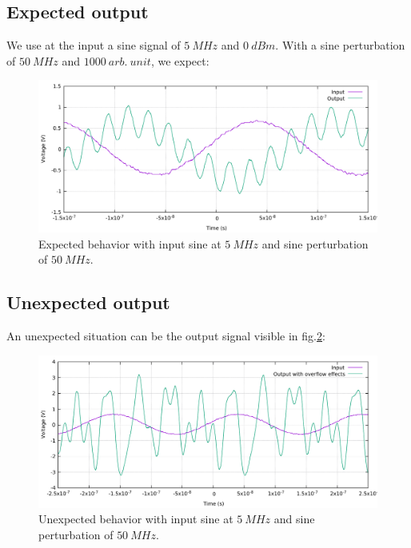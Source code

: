 \documentclass[12pt,oneside]{article}
\begin{document}
\subsection{Expected output}
We use at the input a sine signal of $5~MHz$ and $0~dBm$.
With a sine perturbation of $50~MHz$ and $1000~arb.~unit$, we expect:

\begin{figure}[!h!tb]
	\begin{center}
		\includegraphics[width=14cm]{scope/Mod_amplOk.pdf}
		\caption{Expected behavior with input sine at $5~MHz$ and sine perturbation of $50~MHz$.}
		\label{fig:ampleModOK}
	\end{center}
\end{figure}
\vspace{-0.5cm}
\subsection{Unexpected output}

An unexpected situation can be the output signal visible in fig.\ref{fig:ampleModPasOK}: 

\begin{figure}[!h!tb]
	\begin{center}
		\includegraphics[width=14cm]{scope/Mod_amplPasOk.pdf}
		\caption{Unexpected behavior with input sine at $5~MHz$ and sine perturbation of $50~MHz$.}
		\label{fig:ampleModPasOK}
	\end{center}
\end{figure}
\end{document}

